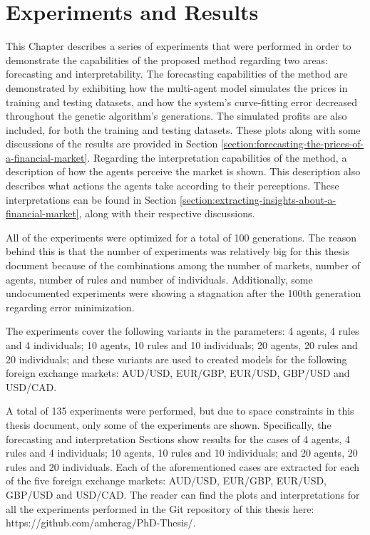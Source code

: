 \chapter{Experiments and Results}
\label{chapter:experiments-and-results}


This Chapter describes a series of experiments that were performed in order to
demonstrate the capabilities of the proposed method regarding two areas:
forecasting and interpretability. The forecasting capabilities of the method are
demonstrated by exhibiting how the multi-agent model simulates the prices in
training and testing datasets, and how the system's curve-fitting error
decreased throughout the genetic algorithm's generations. The simulated profits
are also included, for both the training and testing datasets. These plots along
with some discussions of the results are provided in Section
\ref{section:forecasting-the-prices-of-a-financial-market}. Regarding the
interpretation capabilities of the method, a description of how the agents
perceive the market is shown. This description also describes what actions the
agents take according to their perceptions. These interpretations can be found
in Section \ref{section:extracting-insights-about-a-financial-market}, along
with their respective discussions.

All of the experiments were optimized for a total of 100 generations. The reason
behind this is that the number of experiments was relatively big for this
thesis document because of the combinations among the number of markets, number
of agents, number of rules and number of individuals. Additionally, some
undocumented experiments were showing a stagnation after the 100th generation
regarding error minimization.

The experiments cover the following variants in the parameters: 4 agents, 4
rules and 4 individuals; 10 agents, 10 rules and 10 individuals; 20 agents, 20
rules and 20 individuals; and these variants are used to created models for the
following foreign exchange markets: AUD/USD, EUR/GBP, EUR/USD, GBP/USD and
USD/CAD.

A total of 135 experiments were performed, but due to space constraints in this
thesis document, only some of the experiments are shown. Specifically, the
forecasting and interpretation Sections show results for the cases of 4 agents,
4 rules and 4 individuals; 10 agents, 10 rules and 10 individuals; and 20
agents, 20 rules and 20 individuals. Each of the aforementioned cases are
extracted for each of the five foreign exchange markets: AUD/USD, EUR/GBP,
EUR/USD, GBP/USD and USD/CAD. The reader can find the plots and interpretations
for all the experiments performed in the Git repository of this thesis here:
https://github.com/amherag/PhD-Thesis/.

